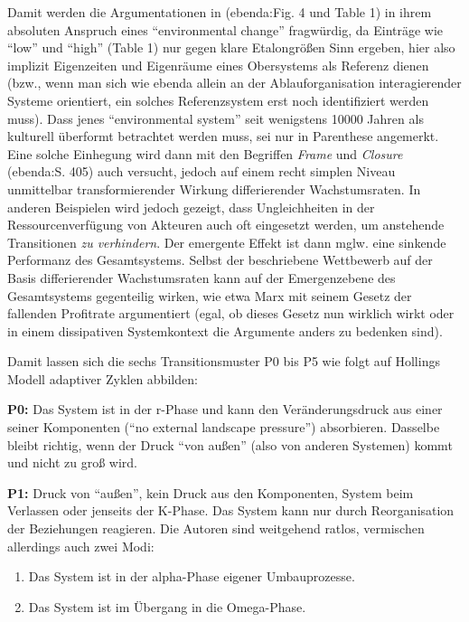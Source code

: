 \documentclass[11pt,a4paper]{article}
\begin{document}
Damit werden die Argumentationen in (ebenda:Fig. 4 und Table 1) in ihrem
absoluten Anspruch eines ``environmental change'' fragwürdig, da
Einträge wie ``low'' und ``high'' (Table 1) nur gegen klare Etalongrößen
Sinn ergeben, hier also implizit Eigenzeiten und Eigenräume eines
Obersystems als Referenz dienen (bzw., wenn man sich wie ebenda allein
an der Ablauforganisation interagierender Systeme orientiert, ein
solches Referenzsystem erst noch identifiziert werden muss). Dass jenes
``environmental system'' seit wenigstens 10000 Jahren als kulturell
überformt betrachtet werden muss, sei nur in Parenthese angemerkt. Eine
solche Einhegung wird dann mit den Begriffen \emph{Frame} und
\emph{Closure} (ebenda:S. 405) auch versucht, jedoch auf einem recht
simplen Niveau unmittelbar transformierender Wirkung differierender
Wachstumsraten. In anderen Beispielen wird jedoch gezeigt, dass
Ungleichheiten in der Ressourcenverfügung von Akteuren auch oft
eingesetzt werden, um anstehende Transitionen \emph{zu verhindern}. Der
emergente Effekt ist dann mglw. eine sinkende Performanz des
Gesamtsystems. Selbst der beschriebene Wettbewerb auf der Basis
differierender Wachstumsraten kann auf der Emergenzebene des
Gesamtsystems gegenteilig wirken, wie etwa Marx mit seinem Gesetz der
fallenden Profitrate argumentiert (egal, ob dieses Gesetz nun wirklich
wirkt oder in einem dissipativen Systemkontext die Argumente anders zu
bedenken sind).

Damit lassen sich die sechs Transitionsmuster P0 bis P5 wie folgt auf
Hollings Modell adaptiver Zyklen abbilden:

\textbf{P0:} Das System ist in der r-Phase und kann den
Veränderungsdruck aus einer seiner Komponenten (``no external landscape
pressure'') absorbieren. Dasselbe bleibt richtig, wenn der Druck ``von
außen'' (also von anderen Systemen) kommt und nicht zu groß wird.

\textbf{P1:} Druck von ``außen'', kein Druck aus den Komponenten, System
beim Verlassen oder jenseits der K-Phase. Das System kann nur durch
Reorganisation der Beziehungen reagieren. Die Autoren sind weitgehend
ratlos, vermischen allerdings auch zwei Modi:

\begin{enumerate}
[noitemsep]
\item
  Das System ist in der alpha-Phase eigener Umbauprozesse.
\item
  Das System ist im Übergang in die Omega-Phase.
\end{enumerate}
\end{document}
